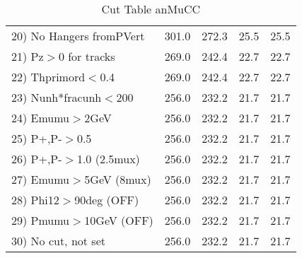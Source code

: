 \begin{table}[h!]
\begin{tabular}{||l||r|r|r|r||}
 20) No Hangers fromPVert &       301.0 &       272.3 &        25.5 &        25.5 \\
 21) Pz$>$0 for tracks    &       269.0 &       242.4 &        22.7 &        22.7 \\
 22) Thprimord$<$0.4      &       269.0 &       242.4 &        22.7 &        22.7 \\
 23) Nunh*fracunh$<$200   &       256.0 &       232.2 &        21.7 &        21.7 \\
 24) Emumu$>$2GeV         &       256.0 &       232.2 &        21.7 &        21.7 \\
 25) P+,P-$>$0.5          &       256.0 &       232.2 &        21.7 &        21.7 \\
 26) P+,P-$>$1.0 (2.5mux) &       256.0 &       232.2 &        21.7 &        21.7 \\
 27) Emumu$>$5GeV  (8mux) &       256.0 &       232.2 &        21.7 &        21.7 \\
 28) Phi12$>$90deg  (OFF) &       256.0 &       232.2 &        21.7 &        21.7 \\
 29) Pmumu$>$10GeV  (OFF) &       256.0 &       232.2 &        21.7 &        21.7 \\
 30) No cut, not set      &       256.0 &       232.2 &        21.7 &        21.7 \\
 \hline
 \hline
 \end{tabular}
 \caption{Cut Table  anMuCC }
 \label{tab-cut_anmcc}
 \end{table}
